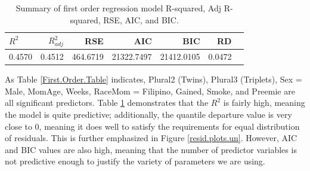 \documentclass{article}\usepackage[]{graphicx}\usepackage[]{xcolor}
\begin{document}
\begin{table}[ht]
\centering
\begin{tabular}{lrrrrrr}
  \hline
$R^2$ & $R^2_{adj}$ & RSE & AIC & BIC & RD\\ 
  \hline
   0.4570 & 0.4512 & 464.6719 & 21322.7497 & 21412.0105 & 0.0472 \\ 
   \hline
\end{tabular}
\caption{Summary of first order regression model R-squared, Adj R-squared, RSE, AIC, and BIC.}
\label{first.order.summary}
\end{table}

As Table \ref{First.Order.Table} indicates, Plural2 (Twins), Plural3 (Triplets), Sex = Male, MomAge, Weeks, RaceMom = Filipino, Gained, Smoke, and Preemie are all significant predictors. Table \ref{first.order.summary} demonstrates that the $R^2$ is fairly high, meaning the model is quite predictive; additionally, the quantile departure value is very close to 0, meaning it does well to satisfy the requirements for equal distribution of residuals. This is further emphasized in Figure \ref{resid.plots.un}. However, AIC and BIC values are also high, meaning that the number of predictor variables is not predictive enough to justify the variety of parameters we are using.
\end{document}
